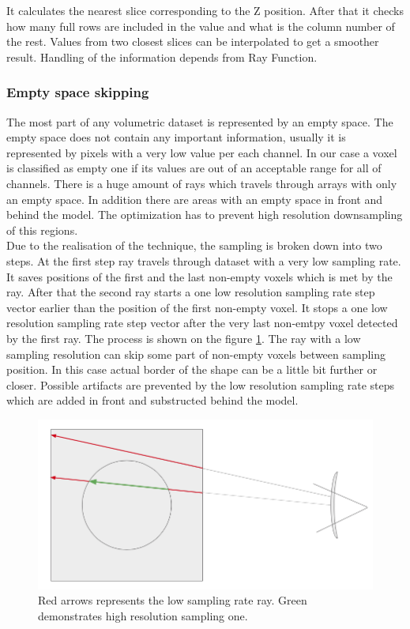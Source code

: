 \documentclass[twoside, english, 11pt]{report}
\begin{document}
It calculates the nearest slice corresponding to the Z position. After that it checks how many full rows are included in the value and what is the column number of the rest. Values from two closest slices can be interpolated to get a smoother result. Handling of the information depends from Ray Function.\\

\subsubsection{Empty space skipping}

The most part of any volumetric dataset is represented by an empty space. The empty space does not contain any important information, usually it is represented by pixels with a very low value per each channel. In our case a voxel is classified as empty one if its values are out of an acceptable range for all of channels. There is a huge amount of rays which travels through arrays with only an empty space. In addition there are areas with an empty space in front and behind the model. The optimization has to prevent high resolution downsampling of this regions.\\

Due to the realisation of the technique, the sampling is broken down into two steps. At the first step ray travels through dataset with a very low sampling rate. It saves positions of the first and the last non-empty voxels which is met by the ray. After that the second ray starts a one low resolution sampling rate step vector earlier than the position of the first non-empty voxel. It stops a one low resolution sampling rate step vector after the very last non-emtpy voxel detected by the first ray. The process is shown on the figure \ref{fig:empty}. The ray with a low sampling resolution can skip some part of non-empty voxels between sampling position. In this case actual border of the shape can be a little bit further or closer.  Possible artifacts are prevented by the low resolution sampling rate steps which are added in front and substructed behind the model.\\

\begin{figure}[!h]
\centerline{\includegraphics[scale = 0.4]{img/empty}}
\caption{Red arrows represents the low sampling rate ray. Green demonstrates high resolution sampling one.\label{fig:empty}}
\end{figure}
\end{document}
